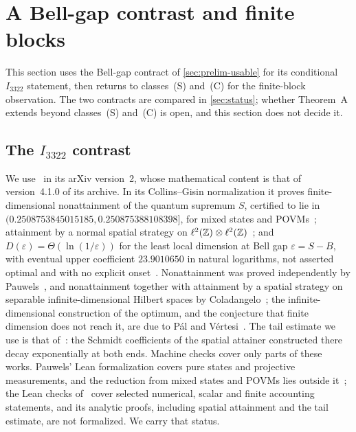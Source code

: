 \section{A Bell-gap contrast and finite blocks}\label{sec:boundary}

This section uses the Bell-gap contract of \cref{sec:prelim-usable} for its conditional $I_{3322}$ statement, then returns to
classes~(S) and~(C) for the finite-block observation. The two contracts are compared in \cref{sec:status}; whether Theorem~A
extends beyond classes~(S) and~(C) is open, and this section does not decide it.

\subsection{The \texorpdfstring{$I_{3322}$}{I3322} contrast}\label{sec:i3322}

We use~\cite{Dou26} in its arXiv version~2, whose mathematical content is that of version~4.1.0 of its archive. In its
Collins--Gisin normalization it proves finite-dimensional nonattainment of the quantum supremum $S$, certified to lie in
$(0.2508753845015185,0.250875388108398]$, for mixed states and POVMs~\cite[Theorem~1]{Dou26}; attainment by a normal spatial
strategy on $\ell^2(\mathbb Z)\otimes\ell^2(\mathbb Z)$~\cite[Theorem~2]{Dou26}; and $D(\varepsilon)=\Theta(\ln(1/\varepsilon))$ for the least local dimension at
Bell gap $\varepsilon=S-B$, with eventual upper coefficient $23.9010650$ in natural logarithms, not asserted optimal and with no
explicit onset~\cite[Theorem~6]{Dou26}. Nonattainment was proved independently by Pauwels~\cite[Theorem~2]{Pau26}, and nonattainment
together with attainment by a spatial strategy on separable infinite-dimensional Hilbert spaces by
Coladangelo~\cite[Theorem~11.1]{Col26}; the infinite-dimensional construction of the optimum, and the conjecture that finite
dimension does not reach it, are due to P\'al and V\'ertesi~\cite{PV10}. The tail estimate
we use is that of~\cite[Section~5.2]{Dou26}: the Schmidt coefficients of the spatial attainer constructed there decay exponentially
at both ends. Machine checks cover only parts of these works. Pauwels' Lean formalization covers pure states and projective
measurements, and the reduction from mixed states and POVMs lies outside it~\cite[Appendix~D]{Pau26}; the Lean checks
of~\cite{Dou26} cover selected numerical, scalar and finite accounting statements, and its analytic proofs, including spatial
attainment and the tail estimate, are not formalized. We carry that status.

